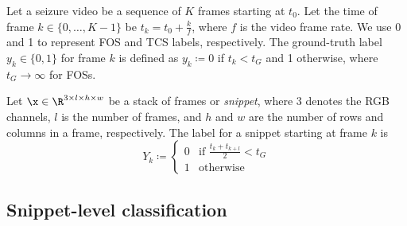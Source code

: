 
Let a seizure video be a sequence of $K$ frames starting at $t_0$.
%
Let the time of frame $k \in \{ 0, \dots, K - 1 \}$ be ${t_k = t_0 + \frac{k}{f}}$, where $f$ is the video frame rate.
%
We use 0 and 1 to represent \ac{FOS} and \ac{TCS} labels, respectively.
The ground-truth label $y_k \in \{0, 1\}$ for frame $k$ is defined as
$y_k \coloneqq 0$ if $t_k < t_G$ and 1 otherwise,
where $t_G \rightarrow \infty$ for \acp{FOS}.

Let $\x \in \R ^ {3 \times l \times h \times w}$ be a stack of frames or \textit{snippet}, where
$3$ denotes the RGB channels,
$l$ is the number of frames,
and $h$ and $w$ are the number of rows and columns in a frame, respectively.
The label for a snippet starting at frame $k$ is
\begin{equation}
    Y_k \coloneqq
    \left\{
        \begin{array}{ll}
            0 & \mbox{if } \frac{t_k + t_{k + l}}{2} < t_G \\
            1 & \mbox{otherwise}
        \end{array}
    \right.
\end{equation}


\subsection{Snippet-level classification}
\label{sec:snippet-level}





